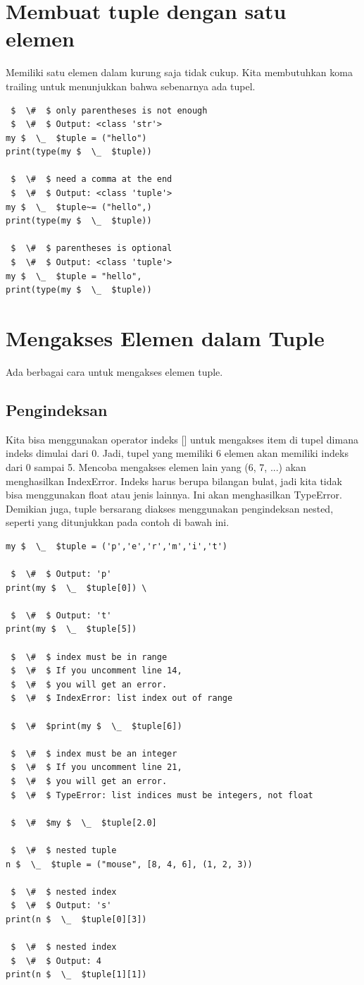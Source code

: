 \section{Membuat tuple dengan satu elemen} 
Memiliki satu elemen dalam kurung saja tidak cukup. Kita membutuhkan koma trailing untuk menunjukkan bahwa sebenarnya ada tupel. 
\begin{verbatim}
 $  \#  $ only parentheses is not enough 
 $  \#  $ Output: <class 'str'> 
my $  \_  $tuple = ("hello") 
print(type(my $  \_  $tuple)) 

 $  \#  $ need a comma at the end 
 $  \#  $ Output: <class 'tuple'> 
my $  \_  $tuple~= ("hello",)   
print(type(my $  \_  $tuple)) 

 $  \#  $ parentheses is optional 
 $  \#  $ Output: <class 'tuple'> 
my $  \_  $tuple = "hello", 
print(type(my $  \_  $tuple)) 
\end{verbatim}
\section{Mengakses Elemen dalam Tuple} 
Ada berbagai cara untuk mengakses elemen tuple. 
\subsection{Pengindeksan}
Kita bisa menggunakan operator indeks [] untuk mengakses item di tupel dimana indeks dimulai dari 0. Jadi, tupel yang memiliki 6 elemen akan memiliki indeks dari 0 sampai 5. Mencoba mengakses elemen lain yang (6, 7, ...) akan menghasilkan IndexError. Indeks harus berupa bilangan bulat, jadi kita tidak bisa menggunakan float atau jenis lainnya. Ini akan menghasilkan TypeError. Demikian juga, tuple bersarang diakses menggunakan pengindeksan nested, seperti yang ditunjukkan pada contoh di bawah ini. 
\begin{verbatim}
my $  \_  $tuple = ('p','e','r','m','i','t') 

 $  \#  $ Output: 'p' 
print(my $  \_  $tuple[0]) \

 $  \#  $ Output: 't' 
print(my $  \_  $tuple[5]) 

 $  \#  $ index must be in range 
 $  \#  $ If you uncomment line 14, 
 $  \#  $ you will get an error. 
 $  \#  $ IndexError: list index out of range 

 $  \#  $print(my $  \_  $tuple[6]) 

 $  \#  $ index must be an integer 
 $  \#  $ If you uncomment line 21, 
 $  \#  $ you will get an error. 
 $  \#  $ TypeError: list indices must be integers, not float 

 $  \#  $my $  \_  $tuple[2.0] 

 $  \#  $ nested tuple 
n $  \_  $tuple = ("mouse", [8, 4, 6], (1, 2, 3)) 

 $  \#  $ nested index 
 $  \#  $ Output: 's' 
print(n $  \_  $tuple[0][3]) 

 $  \#  $ nested index 
 $  \#  $ Output: 4 
print(n $  \_  $tuple[1][1]) 
\end{verbatim}
